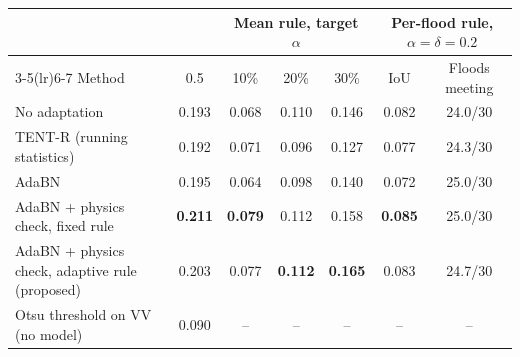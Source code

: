 \begin{tabular}{lcccccc}
\toprule
 & & \multicolumn{3}{c}{Mean rule, target $\alpha$} & \multicolumn{2}{c}{Per-flood rule, $\alpha=\delta=0.2$} \\
\cmidrule(lr){3-5}\cmidrule(lr){6-7}
Method & 0.5 & 10\% & 20\% & 30\% & IoU & Floods meeting \\
\midrule
No adaptation & 0.193 & 0.068 & 0.110 & 0.146 & 0.082 & 24.0/30 \\
TENT-R (running statistics) & 0.192 & 0.071 & 0.096 & 0.127 & 0.077 & 24.3/30 \\
AdaBN & 0.195 & 0.064 & 0.098 & 0.140 & 0.072 & 25.0/30 \\
AdaBN + physics check, fixed rule & \textbf{0.211} & \textbf{0.079} & 0.112 & 0.158 & \textbf{0.085} & 25.0/30 \\
AdaBN + physics check, adaptive rule (proposed) & 0.203 & 0.077 & \textbf{0.112} & \textbf{0.165} & 0.083 & 24.7/30 \\
\midrule
Otsu threshold on VV (no model) & 0.090 & -- & -- & -- & -- & -- \\
\bottomrule
\end{tabular}
